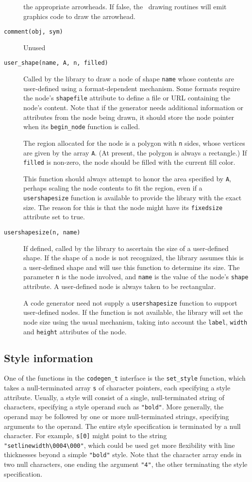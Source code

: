 \begin{description}
the appropriate arrowheads. If false, the \gviz\ drawing routines will emit
graphics code to draw the arrowhead.
\item[{\tt comment(obj, sym)}]
Unused
\item[{\tt user\_shape(name, A, n, filled)}]
Called by the library to draw a node of shape {\tt name}
whose contents are user-defined using a format-dependent mechanism.
Some formats require the node's {\tt shapefile} attribute to define
a file or URL containing the node's content.
Note that if the generator needs additional information or attributes
from the node being drawn, it should store the node pointer when its
{\tt begin\_node} function is called.

The region allocated for the node is a polygon with {\tt n} sides,
whose vertices are given by the array {\tt A}. (At present, the polygon
is always a rectangle.) If {\tt filled} is non-zero,
the node should be filled with the current fill color.

This function should always attempt to honor the
area specified by {\tt A}, perhaps scaling the node contents to 
fit the region, even if a {\tt usershapesize} function is
available to provide the library with the exact size. The reason
for this is that the node might have its {\tt fixedsize} attribute set to true.
\item[{\tt usershapesize(n, name)}]
If defined, called by the library to ascertain the size of a 
user-defined shape. If the shape of a node is
not recognized, the library assumes this is a user-defined shape
and will use this function to determine its size. The parameter
{\tt n} is the node involved, and {\tt name} is the value of the
node's {\tt shape} attribute. A user-defined node is always taken
to be rectangular.

A code generator need not supply a {\tt usershapesize} function to
support user-defined nodes. If the function is not available, the
library will set the node size using the usual mechanism, taking into
account the {\tt label}, {\tt width} and {\tt height} attributes of
the node. 
\end{description}

\subsection{Style information}
\label{sec:style}

One of the functions in the {\tt codegen\_t} interface is the
{\tt set\_style} function, which takes a null-terminated array {\tt s}
of character pointers, each specifying a style attribute. Usually, a
style will consist of a single, null-terminated string of
characters, specifying a style operand such as {\tt "bold"}.
More generally, the operand may be followed by one or more
null-terminated strings, specifying arguments to the operand.
The entire style specification is terminated by a null character.
For example, {\tt s[0]} might point to the string
\verb+"setlinewidth\0004\000"+, which could be used get more
flexibility with line thicknesses beyond a simple {\tt "bold"} style. 
Note that the character array ends in two
null characters, one ending the argument {\tt "4"}, the other terminating
the style specification.

